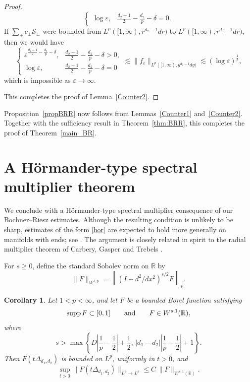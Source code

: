 \documentclass[12pt]{amsart}
\newcommand\Lapd{\Delta_{d_1, d_2}}
\newcommand{\supp}{{\rm supp}{\hspace{.05cm}}}
\newtheorem{coro}[theorem]{Corollary}
\begin{document}
\begin{proof}
\begin{equation*}
\begin{cases}
        \log\varepsilon, & \frac{d_2-1}{2}-\frac{d_2}{p}-\delta = 0.
    \end{cases}
\end{equation*}
If $\sum_{\pm}c_\pm \mathcal S_\pm$ were bounded from $L^p([1,\infty),r^{d_2-1}dr)$ to $L^p([1,\infty),r^{d_1-1}dr)$, then we would have
\begin{equation*}
    \begin{cases}
        \varepsilon^{\frac{d_2-1}{2}-\frac{d_2}{p}-\delta}, & \frac{d_2-1}{2}-\frac{d_2}{p}-\delta>0,\\
        \log\varepsilon, & \frac{d_2-1}{2}-\frac{d_2}{p}-\delta=0
    \end{cases}
    \lesssim
    \|f_\varepsilon\|_{L^p([1,\infty),y^{d_2-1}dy)}
    \lesssim
    (\log\varepsilon)^{\frac{1}{p}},
\end{equation*}
which is impossible as $\varepsilon\to\infty$.


This completes the proof of Lemma~\ref{Counter2}.



    



\end{proof}

Proposition~\ref{propBRR} now follows from
Lemmas~\ref{Counter1} and~\ref{Counter2}. Together with the sufficiency
result in Theorem~\ref{thm:BRR}, this completes the proof of
Theorem~\ref{main_BR}.


\section{A H\"ormander-type spectral multiplier theorem}

We conclude with a H\"ormander-type spectral multiplier consequence of our
Bochner--Riesz estimates. Although the resulting condition is unlikely to be
sharp, estimates of the form \eqref{hor} are expected to hold more generally
on manifolds with ends; see \cite{CSY}. The argument is closely related in
spirit to the radial multiplier theorem of Carbery, Gasper and Trebels
\cite{CarberyGasperTrebels1984}.


For $s\geq 0$, define the standard Sobolev norm on $\mathbb R$  by
\[
  \|F\|_{W^{s,p}}
  =
  \left\|(I-d^2/dx^2)^{s/2}F\right\|_{p}.
\]

\begin{coro}\label{cor:Hormander-multiplier}
Let \(1<p<\infty\), and let \(F\) be a bounded Borel function satisfying
\[
    \supp F\subset[0,1]
    \qquad\text{and}\qquad
    F\in W^{s,1}(\mathbb R),
\]
where
\[
    s>
    \max\left\{
        D\left|\frac1p-\frac12\right|+\frac12,\,
        |d_1-d_2|
        \left|\frac1p-\frac12\right|+1
    \right\}.
\]
Then \(F(t\Lapd)\) is bounded on \(L^p\), uniformly in \(t>0\), and
\begin{equation}
    \label{hor}
    \sup_{t>0}
    \|F(t\Lapd)\|_{L^p\to L^p}
    \leq
    C\,
    \|F\|_{W^{s,1}(\mathbb R)}.
\end{equation}
\end{coro}
\end{document}
